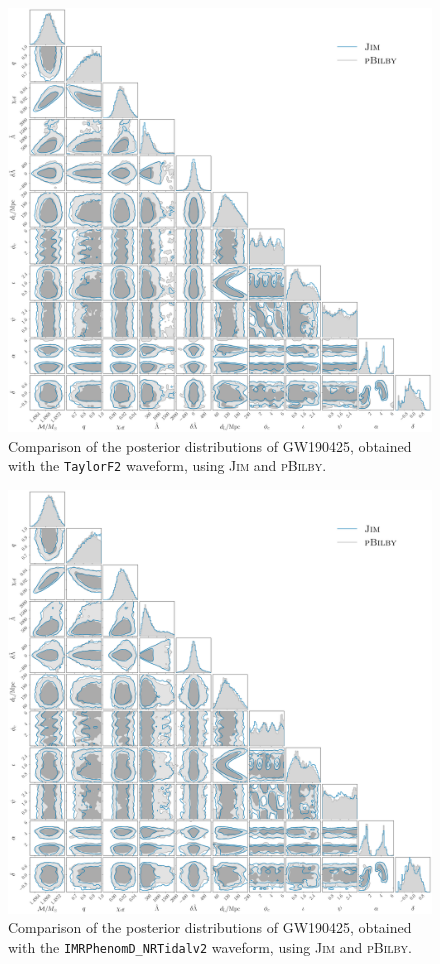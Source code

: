 \documentclass[prd,twocolumn,a4paper,floatfix,nofootinbib,preprintnumbers,superscriptaddress]{revtex4-1}
\begin{document}
\begin{figure}
    \centering
    \includegraphics[width=\textwidth]{GW190425_TaylorF2.pdf}
    \caption{Comparison of the posterior distributions of GW190425, obtained with the \texttt{TaylorF2} waveform, using \textsc{Jim} and \textsc{pBilby}.}
    \label{fig:GW190425_TaylorF2}
\end{figure}

\begin{figure}
    \centering
    \includegraphics[width=\textwidth]{GW190425_NRTidalv2.pdf}
    \caption{Comparison of the posterior distributions of GW190425, obtained with the \texttt{IMRPhenomD\_NRTidalv2} waveform, using \textsc{Jim} and \textsc{pBilby}.}
    \label{fig:GW190425_NRTidalv2}
\end{figure}
\end{document}
